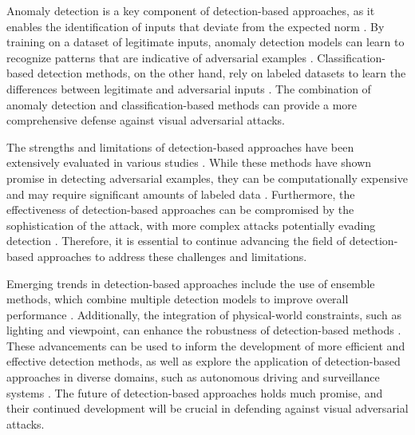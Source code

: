 \documentclass[11pt,a4paper]{article}
\begin{document}
Anomaly detection is a key component of detection-based approaches, as it enables the identification of inputs that deviate from the expected norm \cite{doi:10.1145/3450267.3450535}. By training on a dataset of legitimate inputs, anomaly detection models can learn to recognize patterns that are indicative of adversarial examples \cite{arxiv:1910.11099}. Classification-based detection methods, on the other hand, rely on labeled datasets to learn the differences between legitimate and adversarial inputs \cite{doi:10.1007/978-3-030-58548-8_1}. The combination of anomaly detection and classification-based methods can provide a more comprehensive defense against visual adversarial attacks.

The strengths and limitations of detection-based approaches have been extensively evaluated in various studies \cite{doi:10.1109/iros51168.2021.9636638,doi:10.1109/asp-dac47756.2020.9045584}. While these methods have shown promise in detecting adversarial examples, they can be computationally expensive and may require significant amounts of labeled data \cite{doi:10.1609/aaai.v35i12.17259}. Furthermore, the effectiveness of detection-based approaches can be compromised by the sophistication of the attack, with more complex attacks potentially evading detection \cite{doi:10.1109/cvpr46437.2021.00614}. Therefore, it is essential to continue advancing the field of detection-based approaches to address these challenges and limitations.

Emerging trends in detection-based approaches include the use of ensemble methods, which combine multiple detection models to improve overall performance \cite{arxiv:2110.03825}. Additionally, the integration of physical-world constraints, such as lighting and viewpoint, can enhance the robustness of detection-based methods \cite{arxiv:2007.16118}. These advancements can be used to inform the development of more efficient and effective detection methods, as well as explore the application of detection-based approaches in diverse domains, such as autonomous driving and surveillance systems \cite{doi:10.1007/978-3-030-58589-1_3}. The future of detection-based approaches holds much promise, and their continued development will be crucial in defending against visual adversarial attacks.
\end{document}
